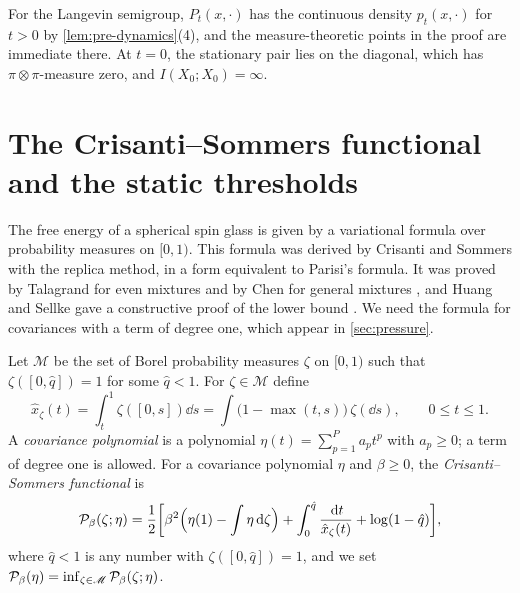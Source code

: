 For the Langevin semigroup, $P_t(x,\cdot)$ has the continuous density $p_t(x,\cdot)$ for $t>0$ by \cref{lem:pre-dynamics}(4), and the measure-theoretic points in the proof are immediate there. At $t=0$, the stationary pair lies on the diagonal, which has $\pi\otimes\pi$-measure zero, and $I(X_0;X_0)=\infty$.

\section{The Crisanti--Sommers functional and the static thresholds}\label{sec:pre-statics}

The free energy of a spherical spin glass is given by a variational formula over probability measures on $[0,1)$. This formula was derived by Crisanti and Sommers \cite{CrisantiSommers1992} with the replica method, in a form equivalent to Parisi's formula. It was proved by Talagrand for even mixtures \cite{Talagrand2006} and by Chen for general mixtures \cite{Chen2013}, and Huang and Sellke gave a constructive proof of the lower bound \cite{HuangSellke2024}. We need the formula for covariances with a term of degree one, which appear in \cref{sec:pressure}.

\begin{definition}\label{def:pre-CS}
Let $\mathscr M$ be the set of Borel probability measures $\zeta$ on $[0,1)$ such that $\zeta([0,\hat q])=1$ for some $\hat q<1$. For $\zeta\in\mathscr M$ define
\[
\hat x_\zeta(t)=\int_t^1\zeta([0,s])\dd s=\int\big(1-\max(t,s)\big)\,\zeta(\dd s),\qquad0\le t\le1.
\]
A \emph{covariance polynomial} is a polynomial $\eta(t)=\sum_{p=1}^Pa_pt^p$ with $a_p\ge0$; a term of degree one is allowed. For a covariance polynomial $\eta$ and $\beta\ge0$, the \emph{Crisanti--Sommers functional} is
\begin{equation}\label{eq:pre-CS}
\mathcal P_\beta(\zeta;\eta)=\frac12\bigg[\beta^2\Big(\eta(1)-\int\eta\,\mathrm d\zeta\Big)+\int_0^{\hat q}\frac{\,\mathrm d t}{\hat x_\zeta(t)}+\log(1-\hat q)\bigg],
\end{equation}
where $\hat q<1$ is any number with $\zeta([0,\hat q])=1$, and we set $\mathcal P_\beta(\eta)=\inf_{\zeta\in\mathscr M}\mathcal P_\beta(\zeta;\eta)$.
\end{definition}


